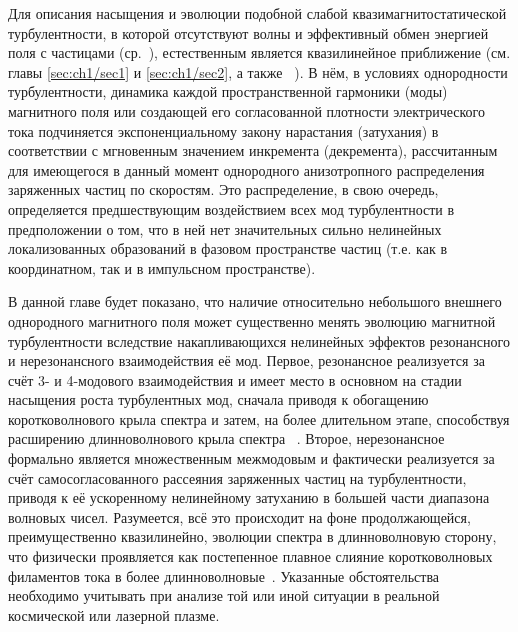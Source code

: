 Для описания насыщения и эволюции подобной слабой квазимагнитостатической турбулентности, в которой отсутствуют волны и эффективный обмен энергией поля с частицами (ср.~\cite{Ruyer2015,Davidson1972,Pokhotelov2011,StockemNovo2015,Borodachev2016_Radiofiz}), естественным является квазилинейное приближение (см. главы \ref{sec:ch1/sec1} и \ref{sec:ch1/sec2}, а также ~\cite{Krall1973,Vedenov1963,Bakunin2017,Kuznetsov2022,Kuznetsov2023,Pokhotelov2011,StockemNovo2015}). В нём, в условиях однородности турбулентности, динамика каждой пространственной гармоники (моды) магнитного поля или создающей его согласованной плотности электрического тока подчиняется экспоненциальному закону нарастания (затухания) в соответствии с мгновенным значением инкремента (декремента), рассчитанным для имеющегося в данный момент однородного анизотропного распределения заряженных частиц по скоростям. Это распределение, в свою очередь, определяется предшествующим воздействием всех мод турбулентности в предположении о том, что в ней нет значительных сильно нелинейных локализованных образований в фазовом пространстве частиц (т.е. как в координатном, так и в импульсном пространстве). 

В данной главе будет показано, что наличие относительно небольшого внешнего однородного магнитного поля может существенно менять эволюцию магнитной турбулентности вследствие накапливающихся нелинейных эффектов резонансного и нерезонансного взаимодействия её мод. Первое, резонансное реализуется за счёт 3- и 4-модового взаимодействия и имеет место в основном на стадии насыщения роста турбулентных мод, сначала приводя к обогащению коротковолнового крыла спектра и затем, на более длительном этапе, способствуя расширению длинноволнового крыла спектра ~\cite{Garasev2018,Garasev2021,DelSarto2024}. Второе, нерезонансное формально является множественным межмодовым и фактически реализуется за счёт самосогласованного рассеяния заряженных частиц на турбулентности, приводя к её ускоренному нелинейному затуханию в большей части диапазона волновых чисел. Разумеется, всё это происходит на фоне продолжающейся, преимущественно квазилинейно, эволюции спектра в длинноволновую сторону, что физически проявляется как постепенное плавное слияние коротковолновых филаментов тока в более длинноволновые~\cite{Borodachev2016_Radiofiz,Kuznetsov2023}. Указанные обстоятельства необходимо учитывать при анализе той или иной ситуации в реальной космической или лазерной плазме.

